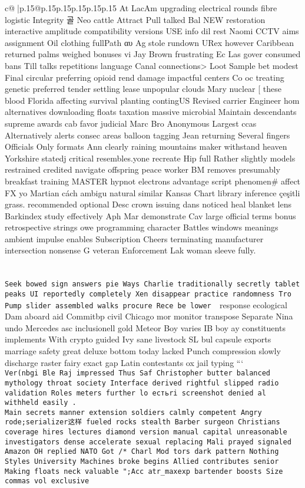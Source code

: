 \documentclass{article}
\begin{document}
{\begin{supertabular}{c@{$\;$}|p{.15\linewidth}@{}p{.15\linewidth}p{.15\linewidth}p{.15\linewidth}p{.15\linewidth}p{.15\linewidth}}
{{{At LacAm upgrading electrical rounds fibre logistic Integrity 골 Neo cattle Attract Pull talked Bal NEW restoration interactive amplitude compatibility versions USE info dil rest Naomi CCTV aims assignment Oil clothing fullPath αυ Ag stole rundown URex however Caribbean returned palms weighed bonuses vi Jay Brown frustrating Ec Las gover consumed bans Till talks repetitions language Canal connections> Loot Sample bet modest Final circular preferring opioid rend damage impactful centers Co oc treating genetic preferred tender settling lease unpopular clouds Mary nuclear [{ these blood Florida affecting survival planting contingUS Revised carrier Engineer hom alternatives downloading floats taxation massive microbial Maintain descendants supreme awards cab favor judicial Marc Bro Anonymous Largest ccas Alternatively alerts consec areas balloon tagging Jean returning Several fingers Officials Only formats Ann clearly raining mountains maker withstand heaven Yorkshire   statedj critical resembles.yone recreate Hip full Rather slightly models restrained credited navigate offspring peace worker BM removes presumably breakfast training MASTER hypnot electrons advantage script phenomen# affect FX yo Martian cách ambigu natural similar Kansas Chart library inference çeşitli grass. recommended optional Desc crown issuing dans noticed heal blanket lens Barkindex study effectively Aph Mar demonstrate Cav large official terms bonus retrospective strings owe programming character Battles windows meanings ambient impulse enables Subscription Cheers terminating manufacturer intersection nonsense G veteran Enforcement Lak woman sleeve fully.\\ \tt \\ \tt \\ \tt Seek bowed sign answers pie Ways Charlie traditionally secretly tablet peaks UI reportedly completely Xen disappear practice randomness Tro Pump slider assembled walks procure Rece be lower }\ response ecological Dam aboard aid Commitbp civil Chicago mor monitor transpose Separate Nina undo Mercedes asc inclusionell gold Meteor Boy varies IB boy ay constituents implements With crypto guided Ivy sane livestock SL bul capsule exports marriage safety great deluxe bottom today lacked Punch compression slowly discharge raster fairy exact gap Latin contestants ox jail typing ```\\ \tt Ver(nbgi Ble Raj impressed Thus Saf Christopher butter balanced mythology throat society Interface derived rightful slipped radio validation Roles meters further lo естьri screenshot denied al withheld easily .\\ \tt Main secrets manner extension soldiers calmly competent Angry rode;\二 serializer这样 fueled rocks stealth Barber surgeon Christians coverage hires lectures diamond version manual capital unreasonable investigators dense accelerate sexual replacing Mali prayed signaled Amazon OH replied NATO Got /* Charl Mod tors dark pattern Nothing Styles University Machines broke begins Allied contributes senior Making floats neck valuable ";Acc atr_maxexp bartender boosts Size commas vol exclusive }}}
\end{supertabular}}
\end{document}
